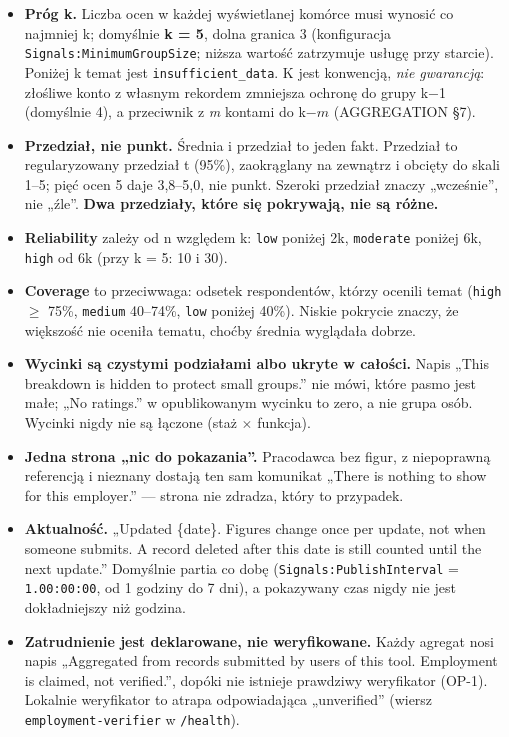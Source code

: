 {\begin{itemize}[leftmargin=*,itemsep=2pt]
  \item \textbf{Próg k.} Liczba ocen w każdej wyświetlanej komórce musi wynosić
        co najmniej k; domyślnie \textbf{k = 5}, dolna granica 3 (konfiguracja
        \texttt{Signals:\allowbreak{}MinimumGroupSize}; niższa wartość zatrzymuje usługę przy
        starcie). Poniżej k temat jest \texttt{insufficient\_\allowbreak{}data}. K jest
        konwencją, \emph{nie gwarancją}: złośliwe konto z własnym rekordem zmniejsza
        ochronę do grupy k$-$1 (domyślnie 4), a przeciwnik z \emph{m} kontami do
        k$-m$ (AGGREGATION §7).
  \item \textbf{Przedział, nie punkt.} Średnia i przedział to jeden fakt.
        Przedział to regularyzowany przedział t (95\%), zaokrąglany na zewnątrz i
        obcięty do skali 1--5; pięć ocen 5 daje 3,8--5,0, nie punkt. Szeroki
        przedział znaczy „wcześnie”, nie „źle”. \textbf{Dwa przedziały, które się
        pokrywają, nie są różne.}
  \item \textbf{Reliability} zależy od n względem k: \texttt{low} poniżej 2k,
        \texttt{moderate} poniżej 6k, \texttt{high} od 6k (przy k = 5: 10 i 30).
  \item \textbf{Coverage} to przeciwwaga: odsetek respondentów, którzy ocenili
        temat (\texttt{high} $\geq$ 75\%, \texttt{medium} 40--74\%, \texttt{low}
        poniżej 40\%). Niskie pokrycie znaczy, że większość nie oceniła tematu,
        choćby średnia wyglądała dobrze.
  \item \textbf{Wycinki są czystymi podziałami albo ukryte w całości.} Napis
        „This breakdown is hidden to protect small groups.” nie mówi, które pasmo
        jest małe; „No ratings.” w opublikowanym wycinku to zero, a nie grupa
        osób. Wycinki nigdy nie są łączone (staż $\times$ funkcja).
  \item \textbf{Jedna strona „nic do pokazania”.} Pracodawca bez figur, z niepoprawną
        referencją i nieznany dostają ten sam komunikat „There is nothing to show for this
        employer.” --- strona nie zdradza, który to przypadek.
  \item \textbf{Aktualność.} „Updated \{date\}. Figures change once per update, not
        when someone submits. A record deleted after this date is still counted
        until the next update.” Domyślnie partia co dobę
        (\texttt{Signals:\allowbreak{}PublishInterval} = \texttt{1.00:00:00}, od 1 godziny do
        7 dni), a pokazywany czas nigdy nie jest dokładniejszy niż godzina.
  \item \textbf{Zatrudnienie jest deklarowane, nie weryfikowane.} Każdy agregat
        nosi napis „Aggregated from records submitted by users of this tool.
        Employment is claimed, not verified.”, dopóki nie istnieje prawdziwy
        weryfikator (OP-1). Lokalnie weryfikator to atrapa odpowiadająca
        „unverified” (wiersz \texttt{employment-\allowbreak{}verifier} w \texttt{/health}).
\end{itemize}

}
